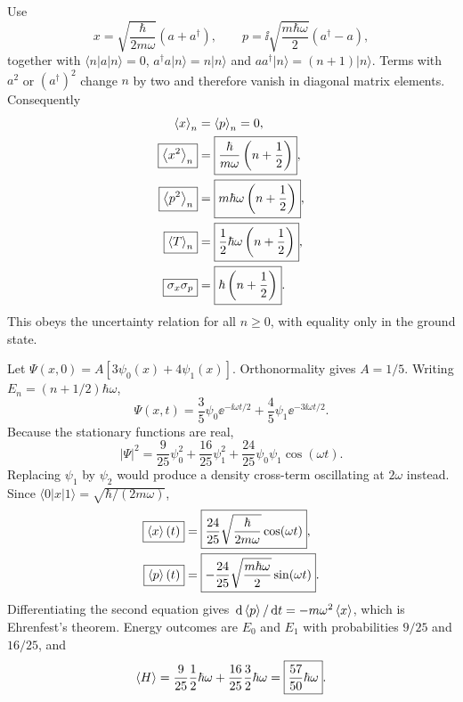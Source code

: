Use
\begin{equation}
x=\sqrt{\frac{\hbar}{2m\omega}}(a+a^\dagger),\qquad
p=\ii\sqrt{\frac{m\hbar\omega}{2}}(a^\dagger-a),
\end{equation}
together with $\langle n|a|n\rangle=0$,
$a^\dagger a|n\rangle=n|n\rangle$ and
$aa^\dagger|n\rangle=(n+1)|n\rangle$.
Terms with $a^2$ or $(a^\dagger)^2$ change $n$ by two
and therefore vanish in diagonal matrix elements.
Consequently
\begin{align}
\left\langle x\right\rangle_n&=\left\langle p\right\rangle_n=0,\\
\boxed{\left\langle x^2\right\rangle_n}&=\boxed{\frac{\hbar}{m\omega}
\left(n+\frac12\right)},\\
\boxed{\left\langle p^2\right\rangle_n}&=\boxed{m\hbar\omega
\left(n+\frac12\right)},\\
\boxed{\left\langle T\right\rangle_n}&=\boxed{\frac12\hbar\omega
\left(n+\frac12\right)},\\
\boxed{\sigma_x\sigma_p}&=\boxed{\hbar\left(n+\frac12\right)}.
\end{align}
This obeys the uncertainty relation for all $n\ge0$,
with equality only in the ground state.

Let $\Psi(x,0)=A[3\psi_0(x)+4\psi_1(x)]$.
Orthonormality gives $A=1/5$.
Writing $E_n=(n+1/2)\hbar\omega$,
\begin{equation}
\Psi(x,t)=\frac35\psi_0\ee^{-\ii\omega t/2}
+\frac45\psi_1\ee^{-3\ii\omega t/2}.
\end{equation}
Because the stationary functions are real,
\begin{equation}
|\Psi|^2=\frac9{25}\psi_0^2+\frac{16}{25}\psi_1^2+
\frac{24}{25}\psi_0\psi_1\cos(\omega t).
\end{equation}
Replacing $\psi_1$ by $\psi_2$ would produce a density
cross-term oscillating at $2\omega$ instead. Since
$\langle0|x|1\rangle=\sqrt{\hbar/(2m\omega)}$,
\begin{align}
\boxed{\left\langle x\right\rangle(t)}&=\boxed{\frac{24}{25}
\sqrt{\frac{\hbar}{2m\omega}}\cos(\omega t)},\\
\boxed{\left\langle p\right\rangle(t)}&=\boxed{-\frac{24}{25}
\sqrt{\frac{m\hbar\omega}{2}}\sin(\omega t)}.
\end{align}
Differentiating the second equation gives
$\,\mathrm d\left\langle p\right\rangle/\,\mathrm d t=-m\omega^2\left\langle x\right\rangle$,
which is Ehrenfest's theorem.
Energy outcomes are $E_0$ and $E_1$ with
probabilities $9/25$ and $16/25$, and
\begin{equation}
\left\langle H\right\rangle=\frac9{25}\frac12\hbar\omega+
\frac{16}{25}\frac32\hbar\omega
=\boxed{\frac{57}{50}\hbar\omega}.
\end{equation}

